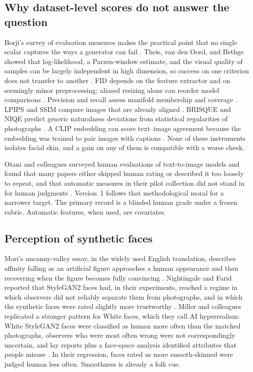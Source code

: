 \documentclass[10pt,twocolumn]{article}
\begin{document}
\subsection{Why dataset-level scores do not answer the question}

Borji's survey of evaluation measures makes the practical point that no single scalar captures the ways a generator can fail \cite{borji2019}. Theis, van den Oord, and Bethge showed that log-likelihood, a Parzen-window estimate, and the visual quality of samples can be largely independent in high dimension, so success on one criterion does not transfer to another \cite{theis2016note}. FID depends on the feature extractor and on seemingly minor preprocessing; aliased resizing alone can reorder model comparisons \cite{heusel2017fid,parmar2022alias}. Precision and recall assess manifold membership and coverage \cite{sajjadi2018pr,kynkaanniemi2019pr}. LPIPS and SSIM compare images that are already aligned \cite{zhang2018lpips,wang2004ssim}. BRISQUE and NIQE predict generic naturalness deviations from statistical regularities of photographs \cite{mittal2012brisque,mittal2013niqe}. A CLIP embedding can score text--image agreement because the embedding was trained to pair images with captions \cite{radford2021clip}. None of these instruments isolates facial skin, and a gain on any of them is compatible with a worse cheek.

Otani and colleagues surveyed human evaluations of text-to-image models and found that many papers either skipped human rating or described it too loosely to repeat, and that automatic measures in their pilot collection did not stand in for human judgments \cite{otani2023}. Version~1 follows that methodological moral for a narrower target. The primary record is a blinded human grade under a frozen rubric. Automatic features, when used, are covariates.

\subsection{Perception of synthetic faces}

Mori's uncanny-valley essay, in the widely used English translation, describes affinity falling as an artificial figure approaches a human appearance and then recovering when the figure becomes fully convincing \cite{mori2012}. Nightingale and Farid reported that StyleGAN2 faces had, in their experiments, reached a regime in which observers did not reliably separate them from photographs, and in which the synthetic faces were rated slightly more trustworthy \cite{nightingale2022}. Miller and colleagues replicated a stronger pattern for White faces, which they call AI hyperrealism: White StyleGAN2 faces were classified as human more often than the matched photographs, observers who were most often wrong were not correspondingly uncertain, and lay reports plus a face-space analysis identified attributes that people misuse \cite{miller2023,valentine1991}. In their regression, faces rated as more smooth-skinned were judged human less often. Smoothness is already a folk cue.
\end{document}
